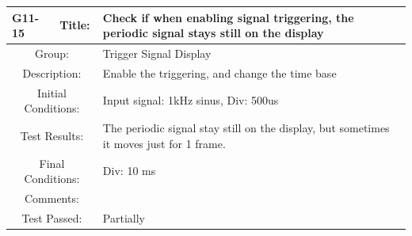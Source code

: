 \documentclass[12pt]{article}
\begin{document}
		\begin{table}[H]
	\begin{center}
		\begin{tabular}{| m{2cm}|m{2cm}|m{12cm}|}
			\hline 
			\bf G11-15&\bf Title:&\bf Check if when enabling signal triggering, the periodic signal stays still on the display\\ 
			\hline 
			\multicolumn{2}{|c|}{Group:}&Trigger Signal Display\\ 
			\hline 
			\multicolumn{2}{|c|}{Description:}&Enable the triggering, and change the time base\\ 
			\hline 
			\multicolumn{2}{|c|}{Initial Conditions:}&Input signal: 1kHz sinus, Div: 500us\\ 
			\hline 
			\multicolumn{2}{|c|}{Test Results:}&The periodic signal stay still on the display, but sometimes it moves just for 1 frame.\\ 
			\hline 
			\multicolumn{2}{|c|}{Final Conditions:}&Div: 10 ms\\ 
			\hline 
			\multicolumn{2}{|c|}{Comments:}&\\ 
			\hline 
			\multicolumn{2}{|c|}{Test Passed:}&Partially \\ 
			\hline 
		\end{tabular} 
	\end{center}
\end{table}	
\end{document}
